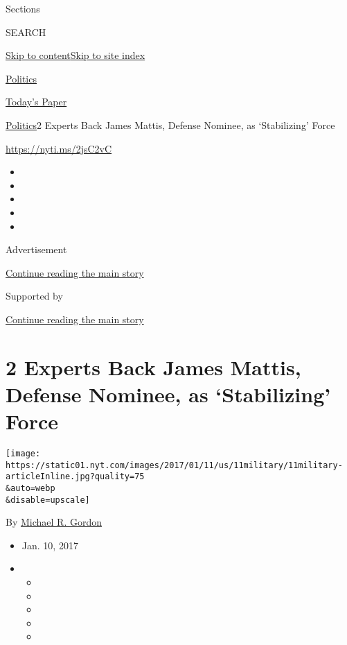 Sections

SEARCH

\protect\hyperlink{site-content}{Skip to
content}\protect\hyperlink{site-index}{Skip to site index}

\href{https://www.nytimes.com/section/politics}{Politics}

\href{https://myaccount.nytimes.com/auth/login?response_type=cookie\&client_id=vi}{}

\href{https://www.nytimes.com/section/todayspaper}{Today's Paper}

\href{/section/politics}{Politics}\textbar{}2 Experts Back James Mattis,
Defense Nominee, as `Stabilizing' Force

\url{https://nyti.ms/2jsC2vC}

\begin{itemize}
\item
\item
\item
\item
\item
\end{itemize}

Advertisement

\protect\hyperlink{after-top}{Continue reading the main story}

Supported by

\protect\hyperlink{after-sponsor}{Continue reading the main story}

\hypertarget{2-experts-back-james-mattis-defense-nominee-as-stabilizing-force}{%
\section{2 Experts Back James Mattis, Defense Nominee, as `Stabilizing'
Force}\label{2-experts-back-james-mattis-defense-nominee-as-stabilizing-force}}

\texttt{[image: https://static01.nyt.com/images/2017/01/11/us/11military/11military-articleInline.jpg?quality=75\\\&auto=webp\\\&disable=upscale]}

By \href{http://www.nytimes.com/by/michael-r-gordon}{Michael R. Gordon}

\begin{itemize}
\item
  Jan. 10, 2017
\item
  \begin{itemize}
  \item
  \item
  \item
  \item
  \item
  \end{itemize}
\end{itemize}

